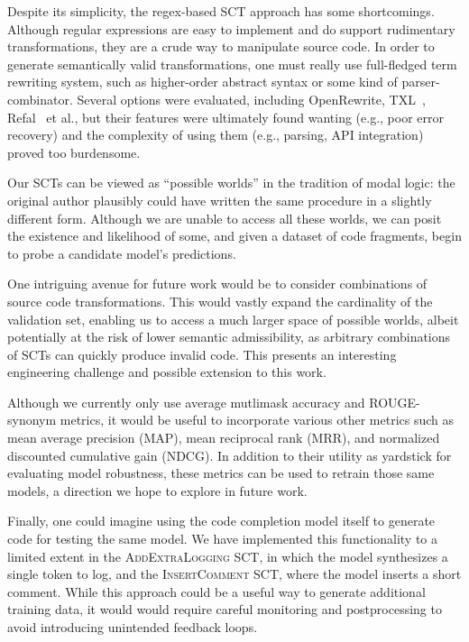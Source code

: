 \documentclass[usenames,dvipsnames]{article} %
\begin{document}
  Despite its simplicity, the regex-based SCT approach has some shortcomings. Although regular expressions are easy to implement and do support rudimentary transformations, they are a crude way to manipulate source code. In order to generate semantically valid transformations, one must really use full-fledged term rewriting system, such as higher-order abstract syntax or some kind of parser-combinator. Several options were evaluated, including OpenRewrite, TXL~\citep{cordy2004txl}, Refal~\citep{gurin1991refal} et al., but their features were ultimately found wanting (e.g., poor error recovery) and the complexity of using them (e.g., parsing, API integration) proved too burdensome.

  Our SCTs can be viewed as ``possible worlds'' in the tradition of modal logic: the original author plausibly could have written the same procedure in a slightly different form. Although we are unable to access all these worlds, we can posit the existence and likelihood of some, and given a dataset of code fragments, begin to probe a candidate model's predictions.

  One intriguing avenue for future work would be to consider combinations of source code transformations. This would vastly expand the cardinality of the validation set, enabling us to access a much larger space of possible worlds, albeit potentially at the risk of lower semantic admissibility, as arbitrary combinations of SCTs can quickly produce invalid code. This presents an interesting engineering challenge and possible extension to this work.

  Although we currently only use average mutlimask accuracy and ROUGE-synonym metrics, it would be useful to incorporate various other metrics such as mean average precision (MAP), mean reciprocal rank (MRR), and normalized discounted cumulative gain (NDCG). In addition to their utility as yardstick for evaluating model robustness, these metrics can be used to retrain those same models, a direction we hope to explore in future work.

  Finally, one could imagine using the code completion model itself to generate code for testing the same model. We have implemented this functionality to a limited extent in the \textsc{AddExtraLogging} SCT, in which the model synthesizes a single token to log, and the \textsc{InsertComment} SCT, where the model inserts a short comment. While this approach could be a useful way to generate additional training data, it would would require careful monitoring and postprocessing to avoid introducing unintended feedback loops.
\end{document}
